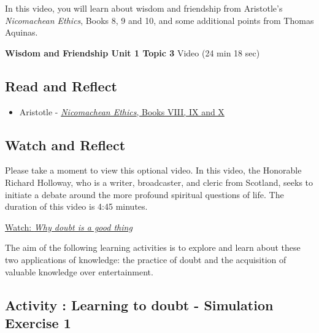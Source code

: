 \documentclass[
]{book}
\providecommand{\tightlist}{%
  \setlength{\itemsep}{0pt}\setlength{\parskip}{0pt}}
\begin{document}
In this video, you will learn about wisdom and friendship from Aristotle's \emph{Nicomachean Ethics}, Books 8, 9 and 10, and some additional points from Thomas Aquinas.

\textbf{Wisdom and Friendship Unit 1 Topic 3} Video (24 min 18 sec)

\hypertarget{read-and-reflect-2}{%
\subsection*{Read and Reflect}\label{read-and-reflect-2}}

\begin{itemize}
\tightlist
\item
  Aristotle - \href{assets/u1/PHIL-100-Aristotle-NE-VIII-IX-X.pdf}{\emph{Nicomachean Ethics}, Books VIII, IX and X}
\end{itemize}

\hypertarget{watch-and-reflect-5}{%
\subsection*{Watch and Reflect}\label{watch-and-reflect-5}}

\begin{reflect}
Please take a moment to view this optional video. In this video, the Honorable Richard Holloway, who is a writer, broadcaster, and cleric from Scotland, seeks to initiate a debate around the more profound spiritual questions of life. The duration of this video is 4:45 minutes.

\href{https://www.youtube.com/watch?v=LERi_Xjfio4}{Watch: \emph{Why doubt is a good thing}}
\end{reflect}

The aim of the following learning activities is to explore and learn about these two applications of knowledge: the practice of doubt and the acquisition of valuable knowledge over entertainment.

\hypertarget{activity-learning-to-doubt---simulation-exercise-1}{%
\subsection*{Activity : Learning to doubt - Simulation Exercise 1}\label{activity-learning-to-doubt---simulation-exercise-1}}
\end{document}
